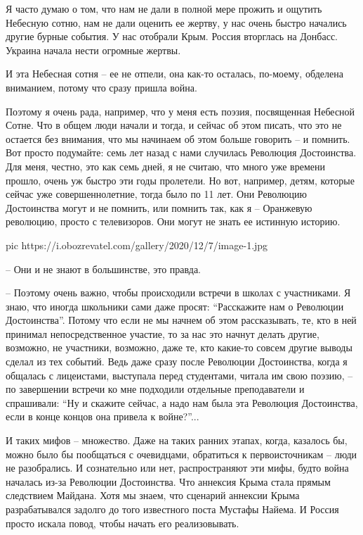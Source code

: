 Я часто думаю о том, что нам не дали в полной мере прожить и ощутить Небесную
сотню, нам не дали оценить ее жертву, у нас очень быстро начались другие бурные
события. У нас отобрали Крым. Россия вторглась на Донбасс. Украина начала нести
огромные жертвы.

И эта Небесная сотня – ее не отпели, она как-то осталась, по-моему, обделена
вниманием, потому что сразу пришла война.

Поэтому я очень рада, например, что у меня есть поэзия, посвященная Небесной
Сотне. Что в общем люди начали и тогда, и сейчас об этом писать, что это не
остается без внимания, что мы начинаем об этом больше говорить – и помнить. Вот
просто подумайте: семь лет назад с нами случилась Революция Достоинства. Для
меня, честно, это как семь дней, я не считаю, что много уже времени прошло,
очень уж быстро эти годы пролетели. Но вот, например, детям, которые сейчас уже
совершеннолетние, тогда было по 11 лет. Они Революцию Достоинства могут и не
помнить, или помнить так, как я – Оранжевую революцию, просто с телевизоров.
Они могут не знать ее истинную историю.

\ifcmt
pic https://i.obozrevatel.com/gallery/2020/12/7/image-1.jpg
\fi

– Они и не знают в большинстве, это правда.

– Поэтому очень важно, чтобы происходили встречи в школах с участниками. Я
знаю, что иногда школьники сами даже просят: \enquote{Расскажите нам о Революции
Достоинства}. Потому что если не мы начнем об этом рассказывать, те, кто в ней
принимал непосредственное участие, то за нас это начнут делать другие,
возможно, не участники, возможно, даже те, кто какие-то совсем другие выводы
сделал из тех событий. Ведь даже сразу после Революции Достоинства, когда я
общалась с лицеистами, выступала перед студентами, читала им свою поэзию, – по
завершении встречи ко мне подходили отдельные преподаватели и спрашивали: \enquote{Ну и
скажите сейчас, а надо нам была эта Революция Достоинства, если в конце концов
она привела к войне?}...

И таких мифов – множество. Даже на таких ранних этапах, когда, казалось бы,
можно было бы пообщаться с очевидцами, обратиться к первоисточникам – люди не
разобрались. И сознательно или нет, распространяют эти мифы, будто война
началась из-за Революции Достоинства. Что аннексия Крыма стала прямым
следствием Майдана. Хотя мы знаем, что сценарий аннексии Крыма разрабатывался
задолго до того известного поста Мустафы Найема. И Россия просто искала повод,
чтобы начать его реализовывать.

